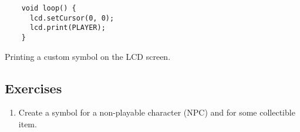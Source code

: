 \documentclass[../sparc.tex]{subfiles}
\begin{document}
\begin{listing}[H]
  \begin{verbatim}
    void loop() {
      lcd.setCursor(0, 0);
      lcd.print(PLAYER);
    }
  \end{verbatim}
  \caption{Printing a custom symbol on the LCD screen.}
  \label{listing:game-dev-lcd-print}
\end{listing}

\subsection{Exercises}
\begin{enumerate}
\item Create a symbol for a non-playable character (\gls{NPC}) and for some
  collectible item.
\end{enumerate}
\end{document}
